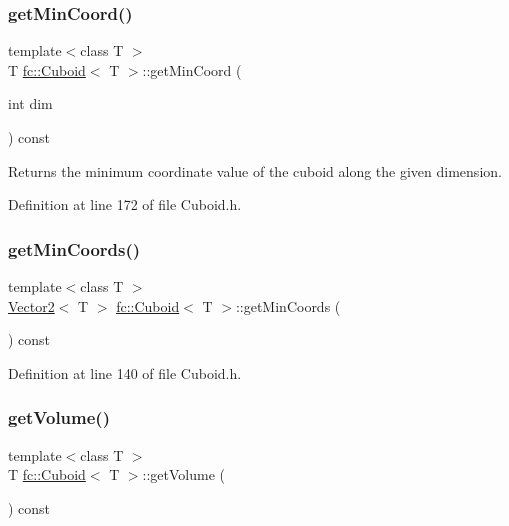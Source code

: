 \subsubsection{\texorpdfstring{get\+Min\+Coord()}{getMinCoord()}}
{\footnotesize\ttfamily template$<$class T $>$ \\
T \hyperlink{classfc_1_1Cuboid}{fc\+::\+Cuboid}$<$ T $>$\+::get\+Min\+Coord (\begin{DoxyParamCaption}\item[{int}]{dim }\end{DoxyParamCaption}) const}

Returns the minimum coordinate value of the cuboid along the given dimension. 

Definition at line 172 of file Cuboid.\+h.

\mbox{\label{classfc_1_1Cuboid_ac170126dd5127d654d565fdaac76f6b7}} 
\subsubsection{\texorpdfstring{get\+Min\+Coords()}{getMinCoords()}}
{\footnotesize\ttfamily template$<$class T $>$ \\
\hyperlink{classfc_1_1Vector2}{Vector2}$<$ T $>$ \hyperlink{classfc_1_1Cuboid}{fc\+::\+Cuboid}$<$ T $>$\+::get\+Min\+Coords (\begin{DoxyParamCaption}{ }\end{DoxyParamCaption}) const}



Definition at line 140 of file Cuboid.\+h.

\mbox{\label{classfc_1_1Cuboid_a921b453c11e22a4ec46003f51c7cb9ba}} 
\subsubsection{\texorpdfstring{get\+Volume()}{getVolume()}}
{\footnotesize\ttfamily template$<$class T $>$ \\
T \hyperlink{classfc_1_1Cuboid}{fc\+::\+Cuboid}$<$ T $>$\+::get\+Volume (\begin{DoxyParamCaption}{ }\end{DoxyParamCaption}) const}



